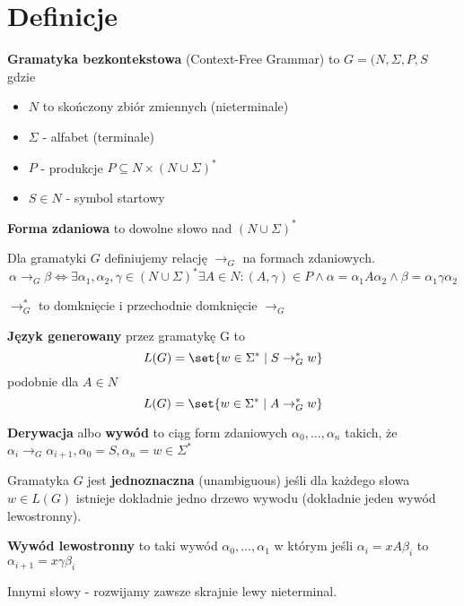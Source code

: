 \section{Definicje}
\begin{definition}
	\textbf{Gramatyka bezkontekstowa} (Context-Free Grammar) to \( G = (N, \Sigma, P, S \) gdzie
	\begin{itemize}
		\item \( N \) to skończony zbiór zmiennych (nieterminale)
		\item \( \Sigma \) - alfabet (terminale)
		\item \( P \) - produkcje \( P \subseteq N \times (N \cup \Sigma)^* \)
		\item \( S \in N \) - symbol startowy
	\end{itemize}
\end{definition}

\begin{definition}
	\textbf{Forma zdaniowa} to dowolne słowo nad \( (N \cup \Sigma)^* \)
\end{definition}

\begin{definition}
	Dla gramatyki \( G \) definiujemy relację \( \rightarrow_G \) na formach zdaniowych.
	\[
		\alpha \rightarrow_G \beta \iff
		\exists \alpha_1, \alpha_2, \gamma \in (N \cup \Sigma)^* \exists A \in N : (A, \gamma) \in P \land
		\alpha = \alpha_1  A \alpha_2 \land \beta = \alpha_1 \gamma \alpha_2
	\]
\end{definition}
\begin{definition}
	\( \rightarrow_G^* \) to domknięcie i przechodnie domknięcie \( \rightarrow_G \)
\end{definition}
\begin{definition}
	\textbf{Język  generowany} przez gramatykę G to
	\[
		L(G) = \set{w \in \Sigma^* \mid S \rightarrow_G^* w}
	\]
	podobnie dla \( A \in N \)
	\[
		L(G) = \set{w \in \Sigma^* \mid A \rightarrow_G^* w}
	\]
\end{definition}
\begin{definition}
	\textbf{Derywacja} albo \textbf{wywód} to ciąg form zdaniowych \( \alpha_0, \dots, \alpha_n \)
	takich, że \( \alpha_i \rightarrow_G \alpha_{i+1}, \alpha_0 = S, \alpha_n = w \in \Sigma^*\)
\end{definition}
\begin{definition}
	Gramatyka \( G \) jest \textbf{jednoznaczna} (unambiguous) jeśli dla każdego słowa \( w \in L(G) \) istnieje dokładnie jedno drzewo wywodu
	(dokładnie jeden wywód lewostronny).
\end{definition}
\begin{definition}
	\textbf{Wywód lewostronny} to taki wywód \( \alpha_0, \dots, \alpha_1 \)
	w którym jeśli \( \alpha_i = xA\beta_i \)
	to \( \alpha_{i+1} = x\gamma\beta_i \)

	Innymi słowy - rozwijamy zawsze skrajnie lewy nieterminal.
\end{definition}

